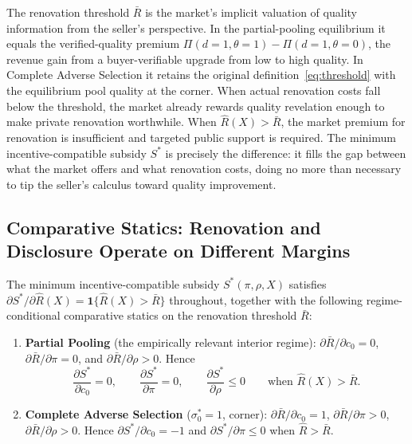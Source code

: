 \documentclass[10pt,letterpaper]{bp-template-concise}
\begin{document}
\noindent The renovation threshold $\bar{R}$ is the market's implicit valuation of quality information from the seller's perspective. In the partial-pooling equilibrium it equals the verified-quality premium $\Pi(d=1,\theta=1)-\Pi(d=1,\theta=0)$, the revenue gain from a buyer-verifiable upgrade from low to high quality. In Complete Adverse Selection it retains the original definition~\eqref{eq:threshold} with the equilibrium pool quality at the corner. When actual renovation costs fall below the threshold, the market already rewards quality revelation enough to make private renovation worthwhile. When $\hat{R}(X)>\bar{R}$, the market premium for renovation is insufficient and targeted public support is required. The minimum incentive-compatible subsidy $S^*$ is precisely the difference: it fills the gap between what the market offers and what renovation costs, doing no more than necessary to tip the seller's calculus toward quality improvement.

\subsection{Comparative Statics: Renovation and Disclosure Operate on Different Margins}

\begin{proposition}
\label{prop:subsidy}
The minimum incentive-compatible subsidy $S^*(\pi,\rho,X)$ satisfies $\partial S^*/\partial \hat R(X) = \mathbf{1}\{\hat R(X) > \bar R\}$ throughout, together with the following regime-conditional comparative statics on the renovation threshold $\bar R$:
\begin{enumerate}[label=(\roman*)]
    \item \textbf{Partial Pooling} (the empirically relevant interior regime): $\partial \bar R/\partial c_0 = 0$, $\partial \bar R/\partial \pi = 0$, and $\partial \bar R/\partial \rho > 0$. Hence
        \[
            \frac{\partial S^*}{\partial c_0} = 0, \qquad
            \frac{\partial S^*}{\partial \pi} = 0, \qquad
            \frac{\partial S^*}{\partial \rho} \leq 0
            \qquad \text{when } \hat R(X) > \bar R.
        \]
    \item \textbf{Complete Adverse Selection} ($\sigma_0^*=1$, corner): $\partial \bar R/\partial c_0 = 1$, $\partial \bar R/\partial \pi > 0$, $\partial \bar R/\partial \rho > 0$. Hence $\partial S^*/\partial c_0 = -1$ and $\partial S^*/\partial \pi \le 0$ when $\hat R > \bar R$.
\end{enumerate}
\end{proposition}
\end{document}
